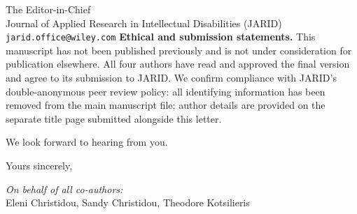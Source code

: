 \documentclass[12pt,a4paper]{letter}
\begin{document}
\begin{letter}{The Editor-in-Chief\\
Journal of Applied Research in Intellectual Disabilities (JARID)\\
\texttt{jarid.office@wiley.com}}
\textbf{Ethical and submission statements.}
This manuscript has not been published previously and is not under consideration
for publication elsewhere. All four authors have read and approved the final
version and agree to its submission to JARID. We confirm compliance with
JARID's double-anonymous peer review policy: all identifying information has
been removed from the main manuscript file; author details are provided on the
separate title page submitted alongside this letter.

We look forward to hearing from you.

\closing{Yours sincerely,}

\vspace{-0.5cm}
\noindent\textit{On behalf of all co-authors:}\\
Eleni Christidou, Sandy Christidou, Theodore Kotsilieris

\end{letter}
\end{document}
